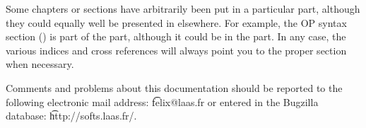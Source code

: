 Some chapters or sections have arbitrarily been put in a particular
part, although they could equally well be presented in elsewhere.
For example, the OP syntax section () is
part of the \CPK{} part, although it could be in the \OPE{} part. In
any case, the various indices and cross references will always point
you to the proper section when necessary.

Comments and problems about this documentation should be reported to the
following electronic mail address: \t{felix@laas.fr} or entered in the
Bugzilla database: \t{http://softs.laas.fr/}.



